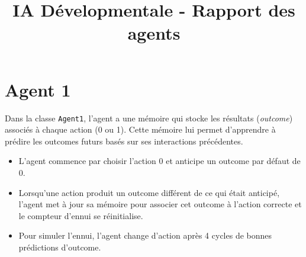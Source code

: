 \documentclass[a4paper, 12pt]{article}
\title{\vspace{-1.5cm} IA Dévelopmentale - Rapport des agents\vspace{-2cm}}
\date{}
\begin{document}
\maketitle 

\thispagestyle{fancy}

\renewcommand{\thesection}{\arabic{section}.}
\section{Agent 1}

\hspace*{\parindent} Dans la classe \texttt{Agent1}, l'agent a une mémoire qui stocke les résultats (\textit{outcome}) associés à chaque action (0 ou 1). Cette mémoire lui permet d'apprendre à prédire les outcomes futurs basés sur ses interactions précédentes.

\begin{itemize}    
    \item L'agent commence par choisir l'action 0 et anticipe un outcome par défaut de 0.
    \item Lorsqu'une action produit un outcome différent de ce qui était anticipé, l'agent met à jour sa mémoire pour associer cet outcome à l'action correcte et le compteur d'ennui se réinitialise.
    \item Pour simuler l'ennui, l'agent change d'action après 4 cycles de bonnes prédictions d'outcome.
\end{itemize}
\end{document}
